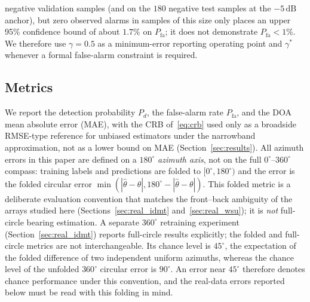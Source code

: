 \documentclass[5p,twocolumn]{elsarticle}
\begin{document}
negative validation samples (and on the $180$ negative test samples at the $-5\,\mathrm{dB}$ anchor), but zero observed alarms in samples of this size only places an upper 95\% confidence bound of about $1.7\%$ on $P_{\mathrm{fa}}$; it does not demonstrate $P_{\mathrm{fa}}<1\%$. We therefore use $\gamma=0.5$ as a minimum-error reporting operating point and $\gamma^*$ whenever a formal false-alarm constraint is required.

\subsection{Metrics}
\label{sec:metrics}
We report the detection probability $P_d$, the false-alarm rate $P_{\mathrm{fa}}$, and the DOA mean absolute error (MAE), with the CRB of~\eqref{eq:crb} used only as a broadside RMSE-type reference for unbiased estimators under the narrowband approximation, not as a lower bound on MAE (Section~\ref{sec:results}).
All azimuth errors in this paper are defined on a $180^\circ$ \emph{azimuth axis}, not on the full $0^\circ$--$360^\circ$ compass: training labels and predictions are folded to $[0^\circ,180^\circ)$ and the error is the folded circular error $\min(|\hat\theta-\theta|,180^\circ-|\hat\theta-\theta|)$. This folded metric is a deliberate evaluation convention that matches the front--back ambiguity of the arrays studied here (Sections~\ref{sec:real_idmt} and~\ref{sec:real_wsu}); it is \emph{not} full-circle bearing estimation. A separate $360^\circ$ retraining experiment (Section~\ref{sec:real_idmt}) reports full-circle results explicitly; the folded and full-circle metrics are not interchangeable. Its chance level is $45^\circ$, the expectation of the folded difference of two independent uniform azimuths, whereas the chance level of the unfolded $360^\circ$ circular error is $90^\circ$. An error near $45^\circ$ therefore denotes chance performance under this convention, and the real-data errors reported below must be read with this folding in mind.
\end{document}
